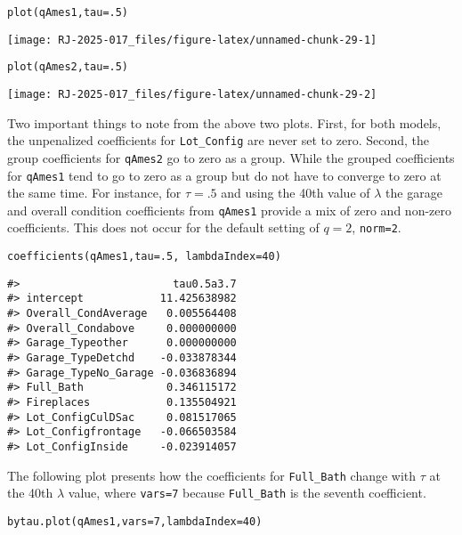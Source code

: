 \begin{verbatim}
plot(qAmes1,tau=.5)
\end{verbatim}

\begin{center}\texttt{[image: RJ-2025-017\_files/figure-latex/unnamed-chunk-29-1]} \end{center}

\begin{verbatim}
plot(qAmes2,tau=.5)
\end{verbatim}

\begin{center}\texttt{[image: RJ-2025-017\_files/figure-latex/unnamed-chunk-29-2]} \end{center}

Two important things to note from the above two plots. First, for both models, the unpenalized coefficients for \texttt{Lot\_Config} are never set to zero. Second, the group coefficients for \texttt{qAmes2} go to zero as a group. While the grouped coefficients for \texttt{qAmes1} tend to go to zero as a group but do not have to converge to zero at the same time. For instance, for \(\tau=.5\) and using the 40th value of \(\lambda\) the garage and overall condition coefficients from \texttt{qAmes1} provide a mix of zero and non-zero coefficients. This does not occur for the default setting of \(q=2\), \texttt{norm=2}.

\begin{verbatim}
coefficients(qAmes1,tau=.5, lambdaIndex=40)
\end{verbatim}

\begin{verbatim}
#>                        tau0.5a3.7
#> intercept            11.425638982
#> Overall_CondAverage   0.005564408
#> Overall_Condabove     0.000000000
#> Garage_Typeother      0.000000000
#> Garage_TypeDetchd    -0.033878344
#> Garage_TypeNo_Garage -0.036836894
#> Full_Bath             0.346115172
#> Fireplaces            0.135504921
#> Lot_ConfigCulDSac     0.081517065
#> Lot_Configfrontage   -0.066503584
#> Lot_ConfigInside     -0.023914057
\end{verbatim}

The following plot presents how the coefficients for \texttt{Full\_Bath} change with \(\tau\) at the 40th \(\lambda\) value, where \texttt{vars=7} because \texttt{Full\_Bath} is the seventh coefficient.

\begin{verbatim}
bytau.plot(qAmes1,vars=7,lambdaIndex=40)
\end{verbatim}

